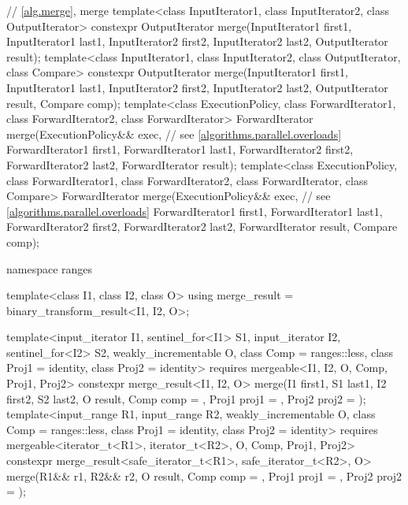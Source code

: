 \begin{codeblock}
{  // \ref{alg.merge}, merge
  template<class InputIterator1, class InputIterator2, class OutputIterator>
    constexpr OutputIterator
      merge(InputIterator1 first1, InputIterator1 last1,
            InputIterator2 first2, InputIterator2 last2,
            OutputIterator result);
  template<class InputIterator1, class InputIterator2, class OutputIterator,
           class Compare>
    constexpr OutputIterator
      merge(InputIterator1 first1, InputIterator1 last1,
            InputIterator2 first2, InputIterator2 last2,
            OutputIterator result, Compare comp);
  template<class ExecutionPolicy, class ForwardIterator1, class ForwardIterator2,
           class ForwardIterator>
    ForwardIterator
      merge(ExecutionPolicy&& exec,                             // see \ref{algorithms.parallel.overloads}
            ForwardIterator1 first1, ForwardIterator1 last1,
            ForwardIterator2 first2, ForwardIterator2 last2,
            ForwardIterator result);
  template<class ExecutionPolicy, class ForwardIterator1, class ForwardIterator2,
           class ForwardIterator, class Compare>
    ForwardIterator
      merge(ExecutionPolicy&& exec,                             // see \ref{algorithms.parallel.overloads}
            ForwardIterator1 first1, ForwardIterator1 last1,
            ForwardIterator2 first2, ForwardIterator2 last2,
            ForwardIterator result, Compare comp);

  namespace ranges {
    template<class I1, class I2, class O>
    using merge_result = binary_transform_result<I1, I2, O>;

    template<input_iterator I1, sentinel_for<I1> S1, input_iterator I2, sentinel_for<I2> S2,
             weakly_incrementable O, class Comp = ranges::less, class Proj1 = identity,
             class Proj2 = identity>
      requires mergeable<I1, I2, O, Comp, Proj1, Proj2>
      constexpr merge_result<I1, I2, O>
        merge(I1 first1, S1 last1, I2 first2, S2 last2, O result,
              Comp comp = {}, Proj1 proj1 = {}, Proj2 proj2 = {});
    template<input_range R1, input_range R2, weakly_incrementable O, class Comp = ranges::less,
             class Proj1 = identity, class Proj2 = identity>
      requires mergeable<iterator_t<R1>, iterator_t<R2>, O, Comp, Proj1, Proj2>
      constexpr merge_result<safe_iterator_t<R1>, safe_iterator_t<R2>, O>
        merge(R1&& r1, R2&& r2, O result,
              Comp comp = {}, Proj1 proj1 = {}, Proj2 proj2 = {});
  }

}
\end{codeblock}
